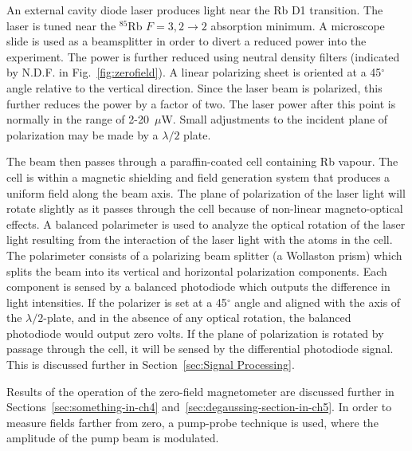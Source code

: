 An external cavity diode laser produces light near the Rb D1
transition.  The laser is tuned near the $^{85}$Rb $F=3,2\rightarrow
2$ absorption minimum.  A microscope slide is used as a beamsplitter
in order to divert a reduced power into the experiment.  The power is
further reduced using neutral density filters (indicated by N.D.F. in
Fig.~\ref{fig:zerofield}).  A linear polarizing sheet is oriented at a
45$^\circ$ angle relative to the vertical direction.  Since the laser
beam is polarized, this further reduces the power by a factor of
two. The laser power after this point is normally in the range of
2-20~$\mu$W.  Small adjustments to the incident plane of polarization
may be made by a $\lambda/2$ plate.

The beam then passes through a paraffin-coated cell containing Rb
vapour.  The cell is within a magnetic shielding and field generation
system that produces a uniform field along the beam axis.  The plane
of polarization of the laser light will rotate slightly as it passes
through the cell because of non-linear magneto-optical effects.  A
balanced polarimeter is used to analyze the optical rotation of the
laser light resulting from the interaction of the laser light with the
atoms in the cell.  The polarimeter consists of a polarizing beam
splitter (a Wollaston prism) which splits the beam into its vertical
and horizontal polarization components.  Each component is sensed by a
balanced photodiode which outputs the difference in light intensities.
If the polarizer is set at a 45$^\circ$ angle and aligned with the
axis of the $\lambda/2$-plate, and in the absence of any optical
rotation, the balanced photodiode would output zero volts.  If the
plane of polarization is rotated by passage through the cell, it will
be sensed by the differential photodiode signal.  This is discussed
further in Section~\ref{sec:Signal Processing}.

Results of the operation of the zero-field magnetometer are discussed
further in Sections~\ref{sec:something-in-ch4}
and~\ref{sec:degaussing-section-in-ch5}.  In order to measure fields
farther from zero, a pump-probe technique is used, where the amplitude
of the pump beam is modulated.

